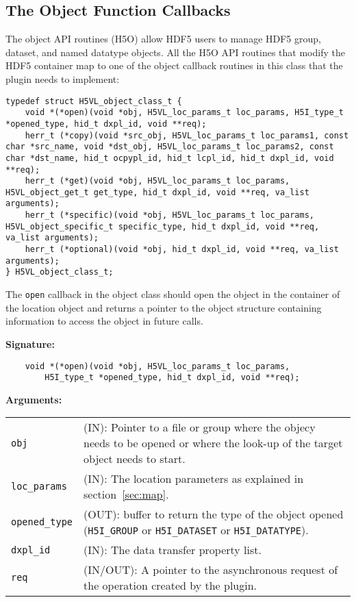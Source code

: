 \subsection{The Object Function Callbacks}
The object API routines (H5O) allow HDF5 users to manage HDF5 group,
dataset, and named datatype objects. All the H5O API routines that
modify the HDF5 container map to one of the object callback routines
in this class that the plugin needs to implement:

\begin{lstlisting}
typedef struct H5VL_object_class_t {
    void *(*open)(void *obj, H5VL_loc_params_t loc_params, H5I_type_t *opened_type, hid_t dxpl_id, void **req);
    herr_t (*copy)(void *src_obj, H5VL_loc_params_t loc_params1, const char *src_name, void *dst_obj, H5VL_loc_params_t loc_params2, const char *dst_name, hid_t ocpypl_id, hid_t lcpl_id, hid_t dxpl_id, void **req);
    herr_t (*get)(void *obj, H5VL_loc_params_t loc_params, H5VL_object_get_t get_type, hid_t dxpl_id, void **req, va_list arguments);
    herr_t (*specific)(void *obj, H5VL_loc_params_t loc_params, H5VL_object_specific_t specific_type, hid_t dxpl_id, void **req, va_list arguments);
    herr_t (*optional)(void *obj, hid_t dxpl_id, void **req, va_list arguments);
} H5VL_object_class_t;
\end{lstlisting}

The {\tt open} callback in the object class should open the object in
the container of the location object and returns a pointer to the
object structure containing information to access the object in future
calls.

\textbf{Signature:}
\begin{lstlisting}
    void *(*open)(void *obj, H5VL_loc_params_t loc_params, 
        H5I_type_t *opened_type, hid_t dxpl_id, void **req);
\end{lstlisting}

\textbf{Arguments:}\\
\begin{tabular}{l p{10cm}}
  {\tt obj} & (IN): Pointer to a file or group where the objecy needs to be
  opened or where the look-up of the target object needs to start.\\
  {\tt loc\_params} & (IN): The location parameters as explained in
  section~\ref{sec:map}.\\
  {\tt opened\_type} & (OUT): buffer to return the type of the object
  opened ({\tt H5I\_GROUP} or {\tt H5I\_DATASET} or {\tt H5I\_DATATYPE}).\\
  {\tt dxpl\_id} & (IN): The data transfer property list.\\
  {\tt req} & (IN/OUT): A pointer to the asynchronous request of the
  operation created by the plugin.\\
\end{tabular}

